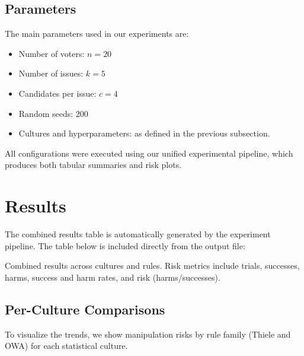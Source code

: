 \documentclass[11pt]{article}
\begin{document}
\subsection{Parameters}
The main parameters used in our experiments are:

\begin{itemize}
    \item Number of voters: $n=20$
    \item Number of issues: $k=5$
    \item Candidates per issue: $c=4$
    \item Random seeds: $200$
    \item Cultures and hyperparameters: as defined in the previous subsection.
\end{itemize}

All configurations were executed using our unified experimental pipeline,
which produces both tabular summaries and risk plots.

\section{Results}
The combined results table is automatically generated by the experiment
pipeline. The table below is included directly from the output file:

\begin{table}[h!]
\centering
\resizebox{\textwidth}{!}{%

}
\caption{Combined results across cultures and rules. Risk metrics include trials,
successes, harms, success and harm rates, and risk (harms/successes).}
\label{tab:combined}
\end{table}

\subsection{Per-Culture Comparisons}
To visualize the trends, we show manipulation risks by rule family (Thiele and OWA)
for each statistical culture.
\end{document}
